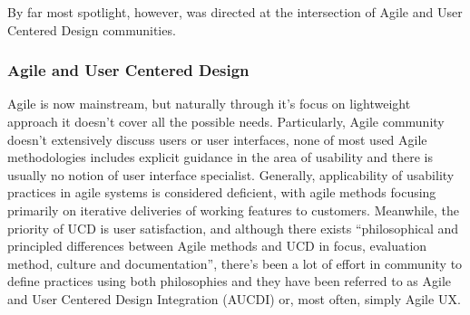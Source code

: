 \documentclass{article}
\begin{document}
By far most spotlight, however, was directed at the intersection of Agile and User Centered Design communities.

\subsubsection{Agile and User Centered Design}
Agile is now mainstream, but naturally through it's focus on lightweight approach it doesn't cover all the possible needs. Particularly, Agile community doesn't extensively discuss users or user interfaces, none of most used Agile methodologies includes explicit guidance in the area of usability and there is usually no notion of user interface specialist. Generally, applicability of usability practices in agile systems is considered deficient, with agile methods focusing primarily on iterative deliveries of working features to customers. Meanwhile, the priority of UCD is user satisfaction, and although there exists ``philosophical and principled differences between Agile methods and UCD in focus, evaluation method, culture and documentation'', there's been a lot of effort in community to define practices using both philosophies and they have been referred to as Agile and User Centered Design Integration (AUCDI) or, most often, simply Agile UX. \cite{salah2014systematic}\cite{jurca2014integrating}
\end{document}
